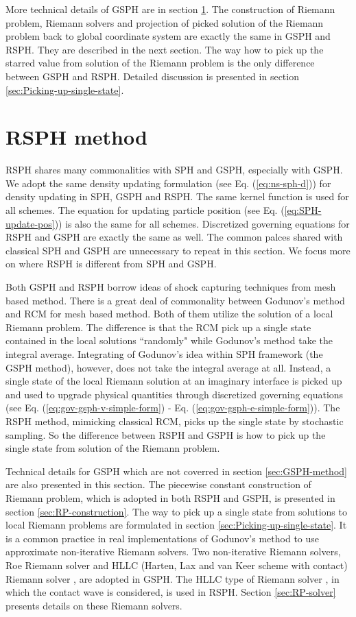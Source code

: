 More technical details of GSPH are in section \ref{sec:RSPH-method}. The construction of Riemann problem, Riemann solvers and projection of picked solution of the Riemann problem back to global coordinate system are exactly the same in GSPH and RSPH. They are described in the next section. The way how to pick up the starred value from solution of the Riemann problem is the only difference between GSPH and RSPH. Detailed discussion is presented in section \ref{sec:Picking-up-single-state}. 

\section{RSPH method} \label{sec:RSPH-method}
RSPH shares many commonalities with SPH and GSPH, especially with GSPH. We adopt the same density updating formulation (see Eq. (\ref{eq:ns-sph-d})) for density updating in SPH, GSPH and RSPH. The same kernel function is used for all schemes. The equation for updating particle position (see Eq. (\ref{eq:SPH-update-pos})) is also the same for all schemes. Discretized governing equations for RSPH and GSPH are exactly the same as well. The common palces shared with classical SPH and GSPH are unnecessary to repeat in this section. We focus more on where RSPH is different from SPH and GSPH.

Both GSPH and RSPH borrow ideas of shock capturing techniques from mesh based method. There is a great deal of commonality between Godunov's method and RCM for mesh based method. Both of them utilize the solution of a local Riemann problem. The difference is that the RCM pick up a single state contained in the local solutions ``randomly" while Godunov's method take the integral average. 
Integrating of Godunov's idea within SPH framework (the GSPH method), however, does not take the integral average at all. Instead, a single state of the local Riemann solution at an imaginary interface is picked up and used to upgrade physical quantities through discretized governing equations (see Eq. (\ref{eq:gov-gsph-v-simple-form}) - Eq. (\ref{eq:gov-gsph-e-simple-form})). The RSPH method, mimicking classical RCM, picks up the single state by stochastic sampling. So the difference between RSPH and GSPH is how to pick up the single state from solution of the Riemann problem.

Technical details for GSPH which are not coverred in section \ref{sec:GSPH-method} are also presented in this section.
The piecewise constant construction of Riemann problem, which is adopted in both RSPH and GSPH, is presented in section \ref{sec:RP-construction}. The way to pick up a single state from solutions to local Riemann problems are formulated in section \ref{sec:Picking-up-single-state}. It is a common practice in real implementations of Godunov's method to use approximate non-iterative Riemann solvers.
Two non-iterative Riemann solvers, Roe Riemann solver and HLLC (Harten, Lax and van Keer scheme with contact) Riemann solver \citep{toro1994restoration}, are adopted in GSPH. The HLLC type of Riemann solver \citep{toro1994restoration}, in which the contact wave is considered, is used in RSPH. Section \ref{sec:RP-solver} presents details on these Riemann solvers. 

